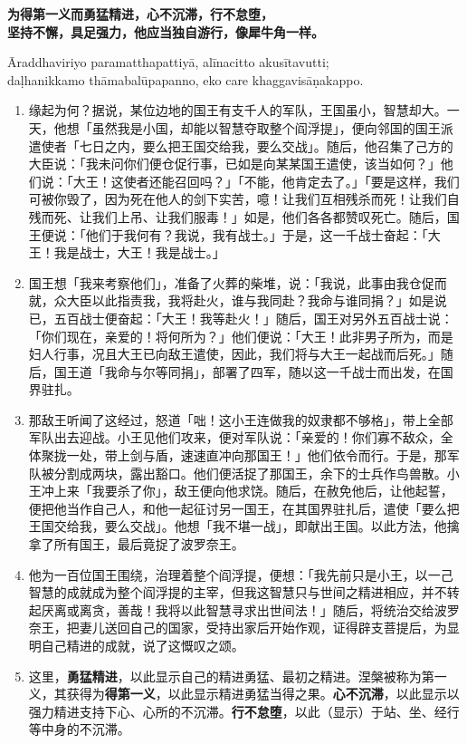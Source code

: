 \textbf{为得第一义而勇猛精进，心不沉滞，行不怠堕，\\}
\textbf{坚持不懈，具足强力，他应当独自游行，像犀牛角一样。}

Āraddhaviriyo paramatthapattiyā, alīnacitto akusītavutti;\\
daḷhanikkamo thāmabalūpapanno, eko care khaggavisāṇakappo. %

\begin{enumerate}\item 缘起为何？据说，某位边地的国王有支千人的军队，王国虽小，智慧却大。一天，他想「虽然我是小国，却能以智慧夺取整个阎浮提」，便向邻国的国王派遣使者「七日之内，要么把王国交给我，要么交战」。随后，他召集了己方的大臣说：「我未问你们便仓促行事，已如是向某某国王遣使，该当如何？」他们说：「大王！这使者还能召回吗？」「不能，他肯定去了。」「要是这样，我们可被你毁了，因为死在他人的剑下实苦，噫！让我们互相残杀而死！让我们自残而死、让我们上吊、让我们服毒！」如是，他们各各都赞叹死亡。随后，国王便说：「他们于我何有？我说，我有战士。」于是，这一千战士奋起：「大王！我是战士，大王！我是战士。」
\item 国王想「我来考察他们」，准备了火葬的柴堆，说：「我说，此事由我仓促而就，众大臣以此指责我，我将赴火，谁与我同赴？我命与谁同捐？」如是说已，五百战士便奋起：「大王！我等赴火！」随后，国王对另外五百战士说：「你们现在，亲爱的！将何所为？」他们便说：「大王！此非男子所为，而是妇人行事，况且大王已向敌王遣使，因此，我们将与大王一起战而后死。」随后，国王道「我命与尔等同捐」，部署了四军，随以这一千战士而出发，在国界驻扎。
\item 那敌王听闻了这经过，怒道「咄！这小王连做我的奴隶都不够格」，带上全部军队出去迎战。小王见他们攻来，便对军队说：「亲爱的！你们寡不敌众，全体聚拢一处，带上剑与盾，速速直冲向那国王！」他们依令而行。于是，那军队被分割成两块，露出豁口。他们便活捉了那国王，余下的士兵作鸟兽散。小王冲上来「我要杀了你」，敌王便向他求饶。随后，在赦免他后，让他起誓，便把他当作自己人，和他一起征讨另一国王，在其国界驻扎后，遣使「要么把王国交给我，要么交战」。他想「我不堪一战」，即献出王国。以此方法，他擒拿了所有国王，最后竟捉了波罗奈王。
\item 他为一百位国王围绕，治理着整个阎浮提，便想：「我先前只是小王，以一己智慧的成就成为整个阎浮提的主宰，但我这智慧只与世间之精进相应，并不转起厌离或离贪，善哉！我将以此智慧寻求出世间法！」随后，将统治交给波罗奈王，把妻儿送回自己的国家，受持出家后开始作观，证得辟支菩提后，为显明自己精进的成就，说了这慨叹之颂。
\item 这里，\textbf{勇猛精进}，以此显示自己的精进勇猛、最初之精进。涅槃被称为第一义，其获得为\textbf{得第一义}，以此显示精进勇猛当得之果。\textbf{心不沉滞}，以此显示以强力精进支持下心、心所的不沉滞。\textbf{行不怠堕}，以此（显示）于站、坐、经行等中身的不沉滞。

\end{enumerate}
